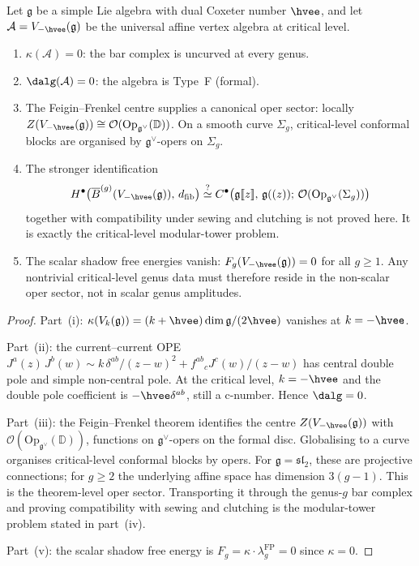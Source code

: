 \documentclass[11pt]{article}
\newcommand{\cA}{\mathcal{A}}
\newcommand{\cO}{\mathcal{O}}
\newcommand{\fg}{\mathfrak{g}}
\newcommand{\fsl}{\mathfrak{sl}}
\newcommand{\barB}{\overline{B}}
\newcommand{\bD}{\mathbb{D}}
\newcommand{\dfib}{d_{\mathrm{fib}}}
\providecommand{\llbracket}{\mathopen{[\![}}
\providecommand{\rrbracket}{\mathclose{]\!]}}
\begin{document}
\begin{theorem}
\label{thm:critical-level-nontrivial}
Let $\fg$ be a simple Lie algebra with dual Coxeter number
$\hvee$, and let $\cA = V_{-\hvee}(\fg)$ be the universal
affine vertex algebra at critical level.
\begin{enumerate}[label=\textup{(\roman*)}]
\item $\kappa(\cA) = 0$: the bar complex is uncurved at
  every genus.
\item $\dalg(\cA) = 0$: the algebra is Type~F (formal).
\item The Feigin--Frenkel centre supplies a canonical oper
  sector: locally
  $Z(V_{-\hvee}(\fg))\cong
  \cO(\mathrm{Op}_{\fg^\vee}(\bD))$.  On a smooth curve
  $\Sigma_g$, critical-level conformal blocks are organised by
  $\fg^\vee$-opers on $\Sigma_g$.
\item The stronger identification
  \[
  H^\bullet\bigl(\barB^{(g)}(V_{-\hvee}(\fg)),\, \dfib\bigr)
  \stackrel{?}{\simeq}
  C^\bullet\bigl(\fg\llbracket z \rrbracket,\,
  \fg((z));\, \cO(\mathrm{Op}_{\fg^\vee}(\Sigma_g))\bigr)
  \]
  together with compatibility under sewing and clutching is not
  proved here.  It is exactly the critical-level modular-tower
  problem.
\item The scalar shadow free energies vanish:
  $F_g(V_{-\hvee}(\fg)) = 0$ for all $g \geq 1$.
  Any nontrivial critical-level genus data must therefore reside
  in the non-scalar oper sector, not in scalar genus amplitudes.
\end{enumerate}
\end{theorem}

\begin{proof}
Part~(i): $\kappa(V_k(\fg)) = (k+\hvee)\dim\fg/(2\hvee)$
vanishes at $k = -\hvee$.

Part~(ii): the current--current OPE $J^a(z)\,J^b(w) \sim
k\,\delta^{ab}/(z-w)^2 + f^{ab}{}_c J^c(w)/(z-w)$ has
central double pole and simple non-central pole.
At the critical level, $k = -\hvee$ and the double pole
coefficient is $-\hvee \delta^{ab}$, still a c-number.
Hence $\dalg = 0$.

Part~(iii): the Feigin--Frenkel theorem identifies the
centre $Z(V_{-\hvee}(\fg))$ with
$\cO(\mathrm{Op}_{\fg^\vee}(\bD))$, functions on
$\fg^\vee$-opers on the formal disc.  Globalising to a curve
organises critical-level conformal blocks by opers.  For
$\fg=\fsl_2$, these are projective connections; for $g\ge2$
the underlying affine space has dimension $3(g-1)$.  This is
the theorem-level oper sector.  Transporting it through the
genus-$g$ bar complex and proving compatibility with sewing
and clutching is the modular-tower problem stated in part~(iv).

Part~(v): the scalar shadow free energy is
$F_g = \kappa \cdot \lambda_g^{\mathrm{FP}} = 0$
since $\kappa = 0$.
\end{proof}
\end{document}
